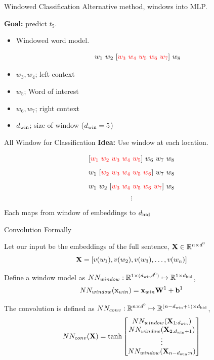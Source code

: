 \documentclass{beamer}
\begin{document}
\begin{frame}{Windowed Classification}
  Alternative method, windows into MLP.

  \textbf{Goal:} predict $t_5$.


  \begin{itemize}
  \item Windowed word model.

  \[ w_1\ w_2\ [\textcolor{red}{w_3\ w_4\ w_5\ w_6\ w_7}]\ w_8 \]

  \item $w_3, w_4$; left context
  \item $w_5$; Word of interest
  \item $w_6, w_7$; right context

  \item ${d_{\mathrm{win}}}$; size of window (${d_{\mathrm{win}}} = 5$)
  \end{itemize}
\end{frame}



\begin{frame}{All Window for Classification}
  \textbf{Idea:} Use window at each location. 

  
     \[ [\textcolor{red}{w_1 \ w_2\ w_3\ w_4\ w_5}]\ w_6\ w_7\ w_8 \]
     \[ w_1\ [\textcolor{red}{w_2\ w_3\ w_4\ w_5\ w_6}]\ w_7\ w_8 \]
     \[ w_1\ w_2\ [\textcolor{red}{w_3\ w_4\ w_5\ w_6\ w_7}]\ w_8 \]
     \[ \vdots\] 

     Each maps from window of embeddings to ${d_{\mathrm{hid}}}$ 
\end{frame}

\begin{frame}{Convolution Formally}
  

  Let our input be the embeddings of the full sentence, $\mathbf{X} \in \mathbb{R}^{n \times d^0}$ 
  \[\mathbf{X} = [v(w_1), v(w_2), v(w_3), \ldots, v(w_n)]\]

  Define a window model as $NN_{window}: \mathbb{R}^{1\times ({d_{\mathrm{win}}} d^0) } \mapsto \mathbb{R}^{1\times {d_{\mathrm{hid}}}}$,
  \[NN_{window}(\mathbf{x}_{win}) = \mathbf{x}_{win} \mathbf{W}^1 + \mathbf{b}^1   \]

  The convolution is defined as $NN_{conv}: \mathbb{R}^{n\times d^0} \mapsto \mathbb{R}^{(n - {d_{\mathrm{win}}} + 1) \times {d_{\mathrm{hid}}}}$, 
  \[NN_{conv}(\mathbf{X}) = \tanh \begin{bmatrix}NN_{window}(\mathbf{X}_{1:{d_{\mathrm{win}}}}) \\   
    NN_{window}(\mathbf{X}_{2:{d_{\mathrm{win}}}+1}) \\
    \vdots \\ 
    NN_{window}(\mathbf{X}_{n-{d_{\mathrm{win}}}:n}) \\
  \end{bmatrix}  \]

\end{frame}
\end{document}

